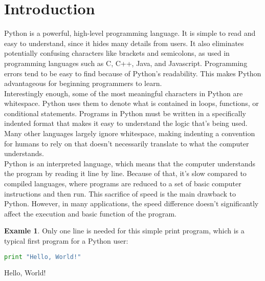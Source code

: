 \documentclass[12pt,openany]{book} %
\theoremstyle{definition}
\newtheorem{soln}{\textbf{Exam\smash{p}le} \nolinebreak }[section]
\newcounter{code}[section]
\begin{document}
\setcounter{chapter}{1}
\setcounter{section}{0}


\section{Introduction}  
Python is a powerful, high-level programming language. It is simple to read and easy to understand, since it hides many details from users. It also eliminates potentially confusing characters like brackets and semicolons, as used in programming languages such as C, C++, Java, and Javascript. Programming errors tend to be easy to find because of Python's readability. This makes Python advantageous for beginning programmers to learn.  \\ \vspace{2mm}
Interestingly enough, some of the most meaningful characters in Python are whitespace. Python uses them to denote what is contained in loops, functions, or conditional statements. Programs in Python must be written in a specifically indented format that makes it easy to understand the logic that's being used. Many other languages largely ignore whitespace, making indenting a convention for humans to rely on that doesn't necessarily translate to what the computer understands.  \\ \vspace{2mm}
Python is an interpreted language, which means that the computer understands the program by reading it line by line. Because of that, it's slow compared to compiled languages, where programs are reduced to a set of basic computer instructions and then run. This sacrifice of speed is the main drawback to Python. However, in many applications, the speed difference doesn't significantly affect the execution and basic function of the program.  \\ \vspace{2mm}
 
\begin{soln} Only one line is needed for this simple print program, which is a typical first program for a Python user: \end{soln}
\begin{code}{}{} \begin{lstlisting}[language=Python]
print "Hello, World!"
\end{lstlisting} \end{code}
\begin{out}{}{} Hello, World! \end{out}
\end{document}
